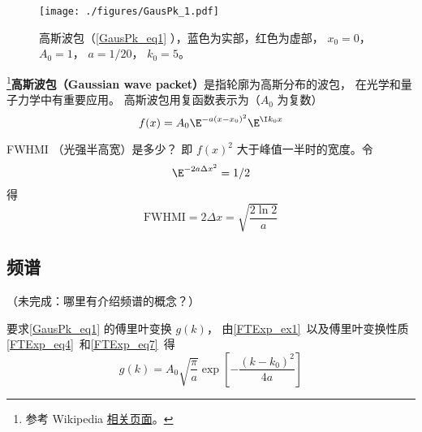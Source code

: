 
\begin{issues}
\issueDraft
\end{issues}


\begin{figure}[ht]
\centering
\texttt{[image: ./figures/GausPk\_1.pdf]}
\caption{高斯波包（\autoref{GausPk_eq1} ），蓝色为实部，红色为虚部， $x_0 = 0$， $A_0 = 1$， $a = 1/20$， $k_0 = 5$。} \label{GausPk_fig1}
\end{figure}

\footnote{参考 Wikipedia \href{https://en.wikipedia.org/wiki/Wave_packet}{相关页面}。}\textbf{高斯波包（Gaussian wave packet）}是指轮廓为高斯分布的波包， 在光学和量子力学中有重要应用。 高斯波包用复函数表示为（$A_0$ 为复数）
\begin{equation}\label{GausPk_eq1}
f(x) = A_0 \E^{-a(x-x_0)^2}\E^{\I k_0 x}
\end{equation}

FWHMI （光强半高宽）是多少？ 即 $f(x)^2$ 大于峰值一半时的宽度。令
\begin{equation}
\E^{-2a\Delta x^2} = 1/2
\end{equation}
得
\begin{equation}
\mathrm{FWHMI} = 2\Delta x = \sqrt{\frac{2\ln 2}{a}}
\end{equation}

\subsection{频谱}
（未完成：哪里有介绍频谱的概念？）

要求\autoref{GausPk_eq1} 的傅里叶变换 $g(k)$， 由\autoref{FTExp_ex1}~以及傅里叶变换性质\autoref{FTExp_eq4}~和\autoref{FTExp_eq7}~得
\begin{equation}
g(k) = A_0\sqrt{\frac{\pi}{a}} \exp[-\frac{(k-k_0)^2}{4a}]
\end{equation}
